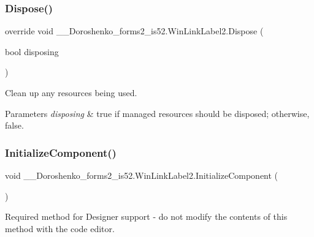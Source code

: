 \subsubsection{\texorpdfstring{Dispose()}{Dispose()}}
{\footnotesize\ttfamily override void \+\_\+\_\+\+Doroshenko\+\_\+forms2\+\_\+is52.\+Win\+Link\+Label2.\+Dispose (\begin{DoxyParamCaption}\item[{bool}]{disposing }\end{DoxyParamCaption})\hspace{0.3cm}{\ttfamily [protected]}}



Clean up any resources being used. 


\begin{DoxyParams}{Parameters}
{\em disposing} & true if managed resources should be disposed; otherwise, false.\\
\hline
\end{DoxyParams}
\hypertarget{class__7___doroshenko__forms2__is52_1_1_win_link_label2_a8089cf25a364a03c2d9385ab3d74ec2e}{}\label{class__7___doroshenko__forms2__is52_1_1_win_link_label2_a8089cf25a364a03c2d9385ab3d74ec2e} 
\subsubsection{\texorpdfstring{Initialize\+Component()}{InitializeComponent()}}
{\footnotesize\ttfamily void \+\_\+\_\+\+Doroshenko\+\_\+forms2\+\_\+is52.\+Win\+Link\+Label2.\+Initialize\+Component (\begin{DoxyParamCaption}{ }\end{DoxyParamCaption})\hspace{0.3cm}{\ttfamily [private]}}



Required method for Designer support -\/ do not modify the contents of this method with the code editor. 

